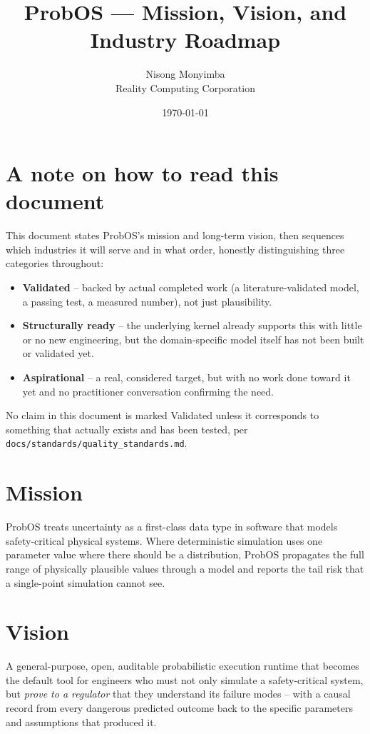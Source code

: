 \documentclass[11pt]{article}
\title{ProbOS --- Mission, Vision, and Industry Roadmap}
\author{Nisong Monyimba \\ Reality Computing Corporation}
\date{\today}
\begin{document}
\maketitle

\section*{A note on how to read this document}
This document states ProbOS's mission and long-term vision, then
sequences which industries it will serve and in what order, honestly
distinguishing three categories throughout:
\begin{itemize}[leftmargin=*]
  \item \textbf{Validated} -- backed by actual completed work
    (a literature-validated model, a passing test, a measured
    number), not just plausibility.
  \item \textbf{Structurally ready} -- the underlying kernel already
    supports this with little or no new engineering, but the
    domain-specific model itself has not been built or validated yet.
  \item \textbf{Aspirational} -- a real, considered target, but with
    no work done toward it yet and no practitioner conversation
    confirming the need.
  \end{itemize}
No claim in this document is marked Validated unless it corresponds
to something that actually exists and has been tested, per
\texttt{docs/standards/quality\_standards.md}.

\section*{Mission}
ProbOS treats uncertainty as a first-class data type in software that
models safety-critical physical systems. Where deterministic
simulation uses one parameter value where there should be a
distribution, ProbOS propagates the full range of physically
plausible values through a model and reports the tail risk that a
single-point simulation cannot see.

\section*{Vision}
A general-purpose, open, auditable probabilistic execution runtime
that becomes the default tool for engineers who must not only
simulate a safety-critical system, but \emph{prove to a regulator}
that they understand its failure modes -- with a causal record from
every dangerous predicted outcome back to the specific parameters and
assumptions that produced it.
\end{document}
